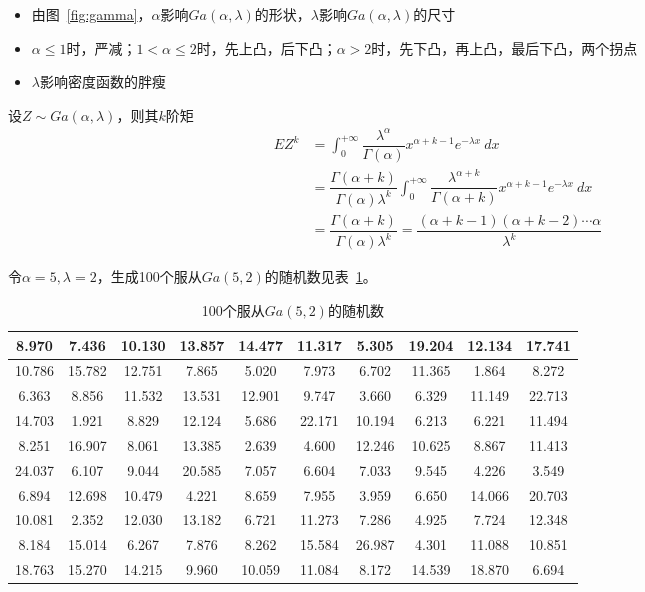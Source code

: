 \begin{note}
    \begin{itemize}
        \item 由图~\ref{fig:gamma}，$\alpha$影响$Ga(\alpha, \lambda)$的形状，$\lambda$影响$Ga(\alpha, \lambda)$的尺寸
        \item $\alpha\leqslant 1$时，严减；$1<\alpha\leqslant 2$时，先上凸，后下凸；$\alpha>2$时，先下凸，再上凸，最后下凸，两个拐点
        \item $\lambda$影响密度函数的胖瘦
    \end{itemize}
\end{note}

设$Z\sim Ga(\alpha, \lambda)$，则其$k$阶矩
\[
    \begin{array}{ll}
        EZ^{k}& = \displaystyle\int_{0}^{+\infty} \dfrac{\lambda^\alpha}{\Gamma(\alpha)}x^{\alpha+k-1}e^{-\lambda x}\ dx \\
        & = \dfrac{\Gamma(\alpha+k)}{\Gamma(\alpha)\lambda^k}\displaystyle\int_{0}^{+\infty} \dfrac{\lambda^{\alpha + k}}{\Gamma(\alpha+k)}x^{\alpha+k-1}e^{-\lambda x}\ dx \\
        &=\dfrac{\Gamma(\alpha+k)}{\Gamma(\alpha)\lambda^k} = \dfrac{(\alpha+k-1)(\alpha+k-2)\cdots \alpha}{\lambda^k}
    \end{array}
\]

令$\alpha = 5,\lambda = 2$，生成100个服从$Ga(5,2)$的随机数见表~\ref{tab:Ga52}。

\begin{longtable}[c]{|c|c|c|c|c|c|c|c|c|c|}
    \caption{100个服从$Ga(5,2)$的随机数}
    \label{tab:Ga52}\\
    \hline
    8.970  & 7.436  & 10.130 & 13.857 & 14.477 & 11.317 & 5.305  & 19.204 & 12.134 & 17.741 \\ \hline
    \endfirsthead
    \endhead
    10.786 & 15.782 & 12.751 & 7.865  & 5.020  & 7.973  & 6.702  & 11.365 & 1.864  & 8.272  \\ \hline
    6.363  & 8.856  & 11.532 & 13.531 & 12.901 & 9.747  & 3.660  & 6.329  & 11.149 & 22.713 \\ \hline
    14.703 & 1.921  & 8.829  & 12.124 & 5.686  & 22.171 & 10.194 & 6.213  & 6.221  & 11.494 \\ \hline
    8.251  & 16.907 & 8.061  & 13.385 & 2.639  & 4.600  & 12.246 & 10.625 & 8.867  & 11.413 \\ \hline
    24.037 & 6.107  & 9.044  & 20.585 & 7.057  & 6.604  & 7.033  & 9.545  & 4.226  & 3.549  \\ \hline
    6.894  & 12.698 & 10.479 & 4.221  & 8.659  & 7.955  & 3.959  & 6.650  & 14.066 & 20.703 \\ \hline
    10.081 & 2.352  & 12.030 & 13.182 & 6.721  & 11.273 & 7.286  & 4.925  & 7.724  & 12.348 \\ \hline
    8.184  & 15.014 & 6.267  & 7.876  & 8.262  & 15.584 & 26.987 & 4.301  & 11.088 & 10.851 \\ \hline
    18.763 & 15.270 & 14.215 & 9.960  & 10.059 & 11.084 & 8.172  & 14.539 & 18.870 & 6.694  \\ \hline
\end{longtable}

